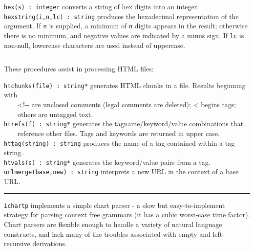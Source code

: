 \texttt{hex(s) : integer} converts a string of hex digits into an
integer.\\
\texttt{hexstring(i,n,lc) : string} produces the
hexadecimal representation of the argument. If \texttt{n} is
supplied, a minimum of \texttt{n} digits appears in the result; otherwise there
is no minimum, and negative values are indicated by a minus sign. If \texttt{lc}
is non-null, lowercase characters are used instead of uppercase.

\vspace{0.25cm}\hrule{}

These procedures assist in processing HTML files:

\texttt{htchunks(file) : string*} generates HTML chunks in a
file. Results beginning with\\
 \ \ \ \ {\textless}!-{}- are unclosed comments
(legal comments are deleted); {\textless} begins tags;\\
 \ \ \ \ others are untagged text.\\
\texttt{htrefs(f) : string*} generates the tagname/keyword/value
combinations that\\
 \ \ \ \ reference other files. Tags and
keywords are returned in upper case.\\
\texttt{httag(string) : string} produces the name of a tag contained
within a tag string.\\
\texttt{htvals(s) : string*} generates the keyword/value pairs from a
tag.\\
\texttt{urlmerge(base,new) : string} interprets a new URL in the context
of a base URL.

\vspace{0.25cm}\hrule{}

\texttt{ichartp} implements a simple chart
parser - a slow but easy-to-implement strategy for parsing
context free grammars (it has a cubic worst-case time factor). Chart
parsers are flexible enough to handle a variety of natural language
constructs, and lack many of the troubles associated with empty and
left-recursive derivations.

